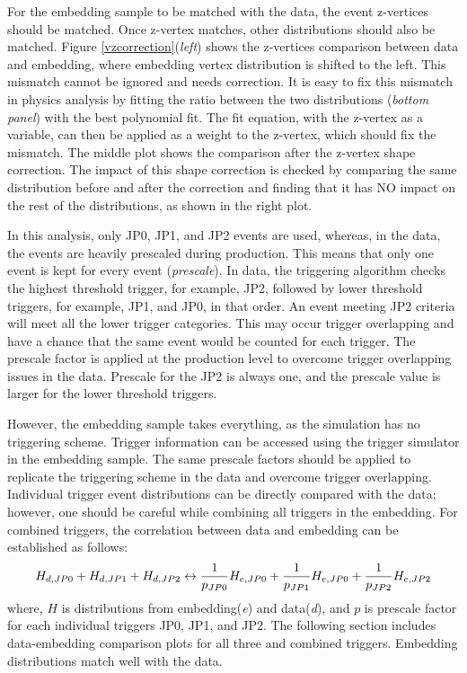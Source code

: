 For the embedding sample to be matched with the data, the event z-vertices should be matched. Once z-vertex matches, other distributions should also be matched. Figure \ref{vzcorrection}(\emph{left}) shows the z-vertices comparison between data and embedding, where embedding vertex distribution is shifted to the left. This mismatch cannot be ignored and needs correction. It is easy to fix this mismatch in physics analysis by fitting the ratio between the two distributions (\emph{bottom panel}) with the best polynomial fit. The fit equation, with the z-vertex as a variable, can then be applied as a weight to the z-vertex, which should fix the mismatch. The middle plot shows the comparison after the z-vertex shape correction. The impact of this shape correction is checked by comparing the same distribution before and after the correction and finding that it has NO impact on the rest of the distributions, as shown in the right plot. 

In this analysis, only JP0, JP1, and JP2 events are used, whereas, in the data, the events are heavily prescaled during production. This means that only one event is kept for every event (\emph{prescale}). In data, the triggering algorithm checks the highest threshold trigger, for example, JP2, followed by lower threshold triggers, for example, JP1, and JP0, in that order. An event meeting JP2 criteria will meet all the lower trigger categories. This may occur trigger overlapping and have a chance that the same event would be counted for each trigger. The prescale factor is applied at the production level to overcome trigger overlapping issues in the data. Prescale for the JP2 is always one, and the prescale value is larger for the lower threshold triggers. 

However, the embedding sample takes everything, as the simulation has no triggering scheme. Trigger information can be accessed using the trigger simulator in the embedding sample. The same prescale factors should be applied to replicate the triggering scheme  in the data and overcome trigger overlapping. Individual trigger event distributions can be directly compared with the data; however, one should be careful while combining all triggers in the embedding. For combined triggers, the correlation between data and embedding can be established as follows: 
\begin{equation}
\centering
	H_{d,JP0} + H_{d,JP1} + H_{d,JP2} \leftrightarrow \frac{1}{p_{JP0}}H_{e,JP0} + \frac{1}{p_{JP1}} H_{e,JP0} +  \frac{1}{p_{JP2}} H_{e,JP2}
\end{equation}
where, $H$ is distributions from embedding(\emph{e}) and data(\emph{d}), and $p$ is prescale factor for each individual triggers JP0, JP1, and JP2. The following section includes data-embedding comparison plots for all three and combined triggers. Embedding distributions match well with the data.      


